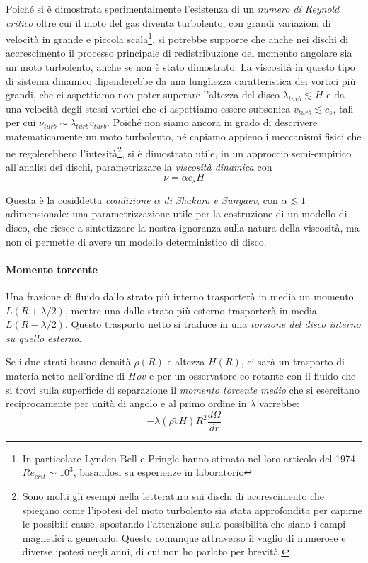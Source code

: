\documentclass[a4paperbi]{article}
\begin{document}
	Poiché si è dimostrata sperimentalmente l'esistenza di un \textit{numero di Reynold critico} oltre cui il moto del gas diventa turbolento, con grandi variazioni di velocità in grande e piccola scala\footnote{In particolare Lynden-Bell e Pringle hanno stimato nel loro articolo del 1974 $Re_{crit}\sim 10^3$, basandosi su esperienze in laboratorio}, si potrebbe supporre che anche nei dischi di accrescimento il processo principale di redistribuzione del momento angolare sia un moto turbolento, anche se non è stato dimostrato.
	La viscosità in questo tipo di sistema dinamico dipenderebbe da una lunghezza caratteristica dei vortici più grandi, che ci aspettiamo non poter superare l'altezza del disco $\lambda_{turb}\lesssim H$ e da una velocità degli stessi vortici che ci aspettiamo essere subsonica $v_{turb}\lesssim c_s$, tali per cui $\nu_{turb}\sim \lambda_{turb}v_{turb}$.
	Poiché non siamo ancora in grado di descrivere matematicamente un moto turbolento, né capiamo appieno i meccanismi fisici che ne regolerebbero l'intesità\footnote{Sono molti gli esempi nella letteratura sui dischi di accrescimento che spiegano come l'ipotesi del moto turbolento sia stata approfondita per capirne le possibili cause, spostando l'attenzione sulla possibilità che siano i campi magnetici a generarlo. Questo comunque attraverso il vaglio di numerose e diverse ipotesi negli anni, di cui non ho parlato per brevità.}, si è dimostrato utile, in un approccio semi-empirico all'analisi dei dischi, parametrizzare la \textit{viscosità dinamica} con
	\begin{equation}
		\nu=\alpha c_s H
	\end{equation}
	
	Questa è la cosiddetta \textit{condizione $\alpha$ di Shakura e Sunyaev}, con $\alpha\lesssim 1$ adimensionale: una parametrizzazione utile per la costruzione di un modello di disco, che riesce a sintetizzare la nostra ignoranza sulla natura della viscosità, ma non ci permette di avere un modello deterministico di disco.
	
	\paragraph{Momento torcente}
	Una frazione di fluido dallo strato più interno trasporterà in media un momento $L(R+\lambda/2)$, mentre una dallo strato più esterno trasporterà in media $L(R-\lambda/2)$. Questo trasporto netto si traduce in una \textit{torsione del disco interno su quello esterno}.
	
	Se i due strati hanno densità $\rho(R)$ e altezza $H(R)$, ci sarà un trasporto di materia netto nell'ordine di $H\rho\tilde{v}$ e per un osservatore co-rotante con il fluido che si trovi sulla superficie di separazione il \textit{momento torcente medio} che si esercitano reciprocamente per unità di angolo e al primo ordine in $\lambda$ varrebbe:
	\begin{equation*}
		-\lambda(\rho\tilde{v} H) R^2\frac{d\Omega}{dr}
	\end{equation*}
	
\end{document}
